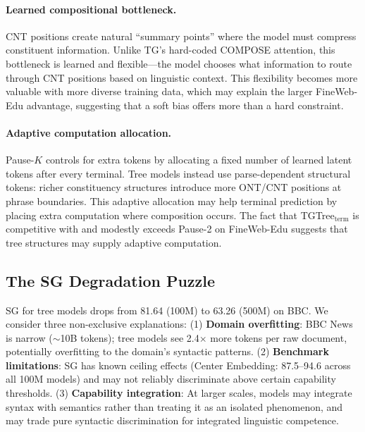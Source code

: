 \documentclass[11pt]{article}
\begin{document}
\paragraph{Learned compositional bottleneck.} CNT positions create natural ``summary points'' where the model must compress constituent information. Unlike TG's hard-coded COMPOSE attention, this bottleneck is learned and flexible---the model chooses what information to route through CNT positions based on linguistic context. This flexibility becomes more valuable with more diverse training data, which may explain the larger FineWeb-Edu advantage, suggesting that a soft bias offers more than a hard constraint.

\paragraph{Adaptive computation allocation.} Pause-$K$ controls for extra tokens by allocating a fixed number of learned latent tokens after every terminal. Tree models instead use parse-dependent structural tokens: richer constituency structures introduce more ONT/CNT positions at phrase boundaries. This adaptive allocation may help terminal prediction by placing extra computation where composition occurs. The fact that TGTree$_{\text{term}}$ is competitive with and modestly exceeds Pause-2 on FineWeb-Edu suggests that tree structures may supply adaptive computation.


\subsection{The SG Degradation Puzzle}
\label{sec:sg-discussion}

SG for tree models drops from 81.64 (100M) to 63.26 (500M) on BBC.
We consider three non-exclusive explanations: (1) \textbf{Domain overfitting}: BBC News is narrow ($\sim$10B tokens); tree models see 2.4$\times$ more tokens per raw document, potentially overfitting to the domain's syntactic patterns.
(2) \textbf{Benchmark limitations}: SG has known ceiling effects (Center Embedding: 87.5--94.6 across all 100M models) and may not reliably discriminate above certain capability thresholds.
(3) \textbf{Capability integration}: At larger scales, models may integrate syntax with semantics rather than treating it as an isolated phenomenon, and may trade pure syntactic discrimination for integrated linguistic competence.
\end{document}
